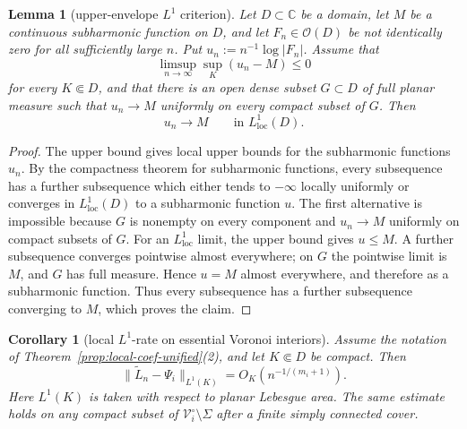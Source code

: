 \documentclass[reqno]{article}
\newtheorem{cor}[theorem]{Corollary}
\newtheorem{lem}[theorem]{Lemma}
\theoremstyle{definition}
\theoremstyle{remark}
\theoremstyle{plain}
\newcommand{\C}{\mathbb C}
\begin{document}
\begin{lem}[upper-envelope \(L^1\) criterion]\label{lem:upper-envelope-l1}
Let $D\subset\C$ be a domain, let $M$ be a continuous subharmonic function on $D$, and let $F_n\in\mathcal O(D)$ be not identically zero for all sufficiently large $n$. Put $u_n:=n^{-1}\log|F_n|$. Assume that
\[
\limsup_{n\to\infty}\sup_K(u_n-M)\le0
\]
for every $K\Subset D$, and that there is an open dense subset $G\subset D$ of full planar measure such that $u_n\to M$ uniformly on every compact subset of $G$. Then
\[
u_n\longrightarrow M\qquad\text{in }L^1_{\mathrm{loc}}(D).
\]
\end{lem}

\begin{proof}
The upper bound gives local upper bounds for the subharmonic functions $u_n$. By the compactness theorem for subharmonic functions, every subsequence has a further subsequence which either tends to $-\infty$ locally uniformly or converges in $L^1_{\mathrm{loc}}(D)$ to a subharmonic function $u$. The first alternative is impossible because $G$ is nonempty on every component and $u_n\to M$ uniformly on compact subsets of $G$. For an $L^1_{\mathrm{loc}}$ limit, the upper bound gives $u\le M$. A further subsequence converges pointwise almost everywhere; on $G$ the pointwise limit is $M$, and $G$ has full measure. Hence $u=M$ almost everywhere, and therefore as a subharmonic function. Thus every subsequence has a further subsequence converging to $M$, which proves the claim.
\end{proof}

\begin{cor}[local $L^1$-rate on essential Voronoi interiors]\label{cor:essential-l1}
Assume the notation of Theorem~\ref{prop:local-coef-unified}\textup{(2)}, and let $K\Subset D$ be compact. Then
\begin{equation}\label{eq:essential-L1-rate}
\bigl\|\widetilde L_n-\Psi_i\bigr\|_{L^1(K)}
=O_K\!\left(n^{-1/(m_i+1)}\right).
\end{equation}
Here \(L^1(K)\) is taken with respect to planar Lebesgue area. The same estimate holds on any compact subset of $\mathcal V_i^\circ\setminus\Sigma$ after a finite simply connected cover.
\end{cor}
\end{document}
